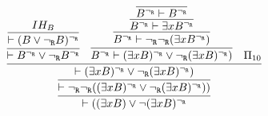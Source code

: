\begin{enumerate}[(i)]
\begin{itemize}
            $$
                \infer{
                    \vdash ((\exists x B) \vee \neg (\exists x B)^\ngr
                }{
                    \infer {
                        \vdash \ngr\ngr((\exists x B)^\ngr \vee \ngr (\exists x B)^\ngr))
                    }{
                        \infer {
                            \vdash (\exists x B)^\ngr \vee \ngr (\exists x B)^\ngr)
                        }{
                            \infer {
                                \vdash B^\ngr \vee \ngr B^\ngr
                            }{
                                \infer {
                                    \vdash (B \vee \ngr B)^\ngr
                                }{
                                    IH_B
                                }
                            }&
                            \infer {
                                B^\ngr \vdash (\exists x B)^\ngr \vee \ngr (\exists x B)^\ngr)
                            }{
                                \infer {
                                    B^\ngr \vdash \ngr\ngr (\exists x B^\ngr)
                                }{
                                   \infer {
                                       B^\ngr \vdash \exists x B^\ngr
                                    }{
                                        \infer {
                                           B^\ngr \vdash B^\ngr
                                        }{
                                        }
                                    }
                                }
                            }&
                            \Pi_{10}
                        }
                    }
                }
            $$
    \end{itemize}


\end{enumerate}
